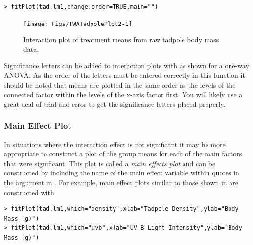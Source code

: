 \documentclass[10pt,openany]{book}\usepackage[]{graphicx}\usepackage[]{color}
\makeatletter
\newenvironment{kframe}{%
 \def\at@end@of@kframe{}%
 \ifinner\ifhmode%
  \def\at@end@of@kframe{\end{minipage}}%
  \begin{minipage}{\columnwidth}%
 \fi\fi%
 \def\FrameCommand##1{\hskip\@totalleftmargin \hskip-\fboxsep
 \colorbox{shadecolor}{##1}\hskip-\fboxsep
     \hskip-\linewidth \hskip-\@totalleftmargin \hskip\columnwidth}%
 \MakeFramed {\advance\hsize-\width
   \@totalleftmargin\z@ \linewidth\hsize
   \@setminipage}}%
 {\par\unskip\endMakeFramed%
 \at@end@of@kframe}
\newenvironment{knitrout}{}{} %
\makeatother
\begin{document}
\begin{knitrout}
\color{fgcolor}\begin{kframe}
\begin{verbatim}
> fitPlot(tad.lm1,change.order=TRUE,main="")
\end{verbatim}
\end{kframe}\begin{figure}[h]

{\centering \texttt{[image: Figs/TWATadpolePlot2-1]} 

}

\caption[Interaction plot of treatment means from raw tadpole body mass data]{Interaction plot of treatment means from raw tadpole body mass data.}\label{fig:TWATadpolePlot2}
\end{figure}


\end{knitrout}

Significance letters can be added to interaction plots with  as shown for a one-way ANOVA.  As the order of the letters must be entered correctly in this function it should be noted that means are plotted in the same order as the levels of the connected factor within the levels of the x-axis factor first.  You will likely use a great deal of trial-and-error to get the significance letters placed properly.

\subsubsection*{Main Effect Plot}
In situations where the interaction effect is not significant it may be more appropriate to construct a plot of the group means for each of the main factors that were significant.  This plot is called a \emph{main effects plot} and can be constructed by including the name of the main effect variable within quotes in the  argument in .  For example, main effect plots similar to those shown in  are constructed with

\begin{knitrout}
\color{fgcolor}\begin{kframe}
\begin{verbatim}
> fitPlot(tad.lm1,which="density",xlab="Tadpole Density",ylab="Body Mass (g)")
> fitPlot(tad.lm1,which="uvb",xlab="UV-B Light Intensity",ylab="Body Mass (g)")
\end{verbatim}
\end{kframe}
\end{knitrout}
\end{document}

